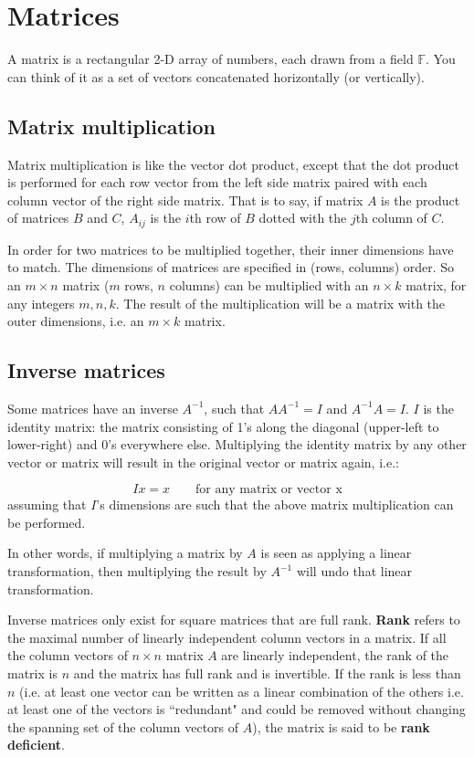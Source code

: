 \documentclass[12pt]{article}
\begin{document}
\section*{Matrices}
A matrix is a rectangular 2-D array of numbers, each drawn from a field $\mathbb{F}$. You can think of it as a set of vectors concatenated horizontally (or vertically).

\subsection*{Matrix multiplication}
Matrix multiplication is like the vector dot product, except that the dot product is performed for each row vector from the left side matrix paired with each column vector of the right side matrix. That is to say, if matrix $A$ is the product of matrices $B$ and $C$, $A_{ij}$ is the $i$th row of $B$ dotted with the $j$th column of $C$.

In order for two matrices to be multiplied together, their inner dimensions have to match. The dimensions of matrices are specified in (rows, columns) order. So an $m \times n$ matrix ($m$ rows, $n$ columns) can be multiplied with an $n \times k$ matrix, for any integers $m, n, k$. The result of the multiplication will be a matrix with the outer dimensions, i.e. an $m \times k$ matrix.

\subsection*{Inverse matrices}

Some matrices have an inverse $A^{-1}$, such that $AA^{-1} = I$ and $A^{-1}A = I$. $I$ is the identity matrix: the matrix consisting of 1's along the diagonal (upper-left to lower-right) and 0's everywhere else. Multiplying the identity matrix by any other vector or matrix will result in the original vector or matrix again, i.e.:

\begin{equation}
    Ix = x \qquad \text{for any matrix or vector x}
\end{equation}
assuming that $I$'s dimensions are such that the above matrix multiplication can be performed.

In other words, if multiplying a matrix by $A$ is seen as applying a linear transformation, then multiplying the result by $A^{-1}$ will undo that linear transformation.

Inverse matrices only exist for square matrices that are full rank.  \textbf{Rank} refers to the maximal number of linearly independent column vectors in a matrix. If all the column vectors of $n \times n$ matrix $A$ are linearly independent, the rank of the matrix is $n$ and the matrix has full rank and is invertible. If the rank is less than $n$ (i.e. at least one vector can be written as a linear combination of the others i.e. at least one of the vectors is ``redundant" and could be removed without changing the spanning set of the column vectors of $A$), the matrix is said to be \textbf{rank deficient}.
\end{document}
